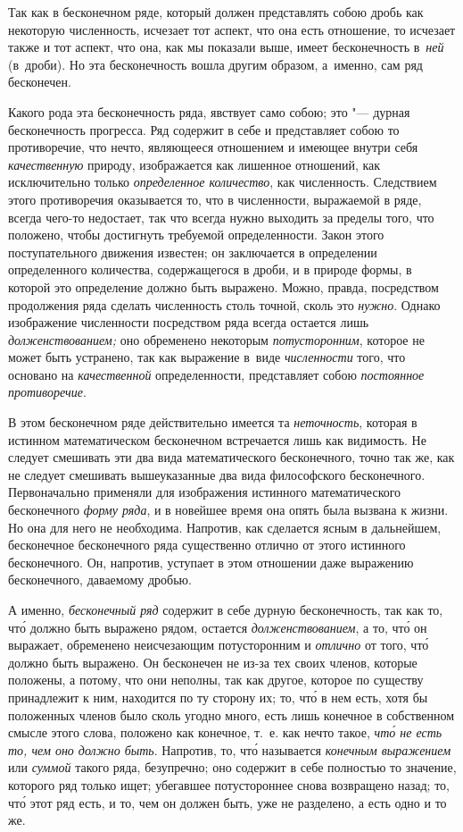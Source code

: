 Так как в бесконечном ряде, который должен представлять собою дробь как
некоторую численность, исчезает тот аспект, что она есть отношение, то исчезает
также и тот аспект, что она, как мы показали выше, имеет бесконечность
в~{\em ней} (в~дроби). Но эта бесконечность вошла другим образом, а~именно,
сам ряд бесконечен.

Какого рода эта бесконечность ряда, явствует само собою; это "--- дурная
бесконечность прогресса. Ряд содержит в себе и представляет собою то
противоречие, что нечто, являющееся отношением и имеющее внутри себя
{\em качественную} природу, изображается как лишенное отношений, как
исключительно только {\em определенное количество}, как численность. Следствием
этого противоречия оказывается то, что в численности, выражаемой в ряде, всегда
чего-то недостает, так что всегда нужно выходить за пределы того, что положено,
чтобы достигнуть требуемой определенности. Закон этого поступательного движения
известен; он заключается в определении определенного количества, содержащегося
в дроби, и в природе формы, в которой это определение должно быть выражено.
Можно, правда, посредством продолжения ряда сделать численность столь точной,
сколь это {\em нужно}. Однако изображение численности посредством ряда всегда
остается лишь {\em долженствованием;} оно обременено некоторым
{\em потусторонним}, которое не может быть устранено, так как выражение в~виде
{\em численности} того, что основано на {\em качественной} определенности,
представляет собою {\em постоянное противоречие}.

\label{bkm:bm52a}В этом бесконечном ряде действительно имеется та
{\em неточность}, которая в истинном математическом бесконечном встречается
лишь как видимость. Не следует смешивать эти два вида математического
бесконечного, точно так же, как не следует смешивать вышеуказанные два вида
философского бесконечного. Первоначально применяли для изображения истинного
математического бесконечного {\em форму ряда}, и в новейшее время она опять
была вызвана к жизни. Но она для него не необходима. Напротив, как сделается
ясным в дальнейшем, бесконечное бесконечного ряда существенно отлично от этого
истинного бесконечного. Он, напротив, уступает в этом отношении даже выражению
бесконечного, даваемому дробью.

А именно, {\em бесконечный ряд} содержит в себе дурную бесконечность, так как
то, чт\'{о} должно быть выражено рядом, остается {\em долженствованием}, а то,
чт\'{о} он выражает, обременено неисчезающим потусторонним и {\em отлично} от
того, чт\'{о} должно быть выражено. Он бесконечен не из-за тех своих членов,
которые положены, а потому, что они неполны, так как другое, которое по
существу принадлежит к ним, находится по ту сторону их; то, чт\'{о} в нем есть,
хотя бы положенных членов было сколь угодно много, есть лишь конечное в
собственном смысле этого слова, положено как конечное, т.~е. как нечто такое,
{\em чт\'{о} не есть то, чем оно должно быть}. Напротив, то, чт\'{о} называется
{\em конечным выражением} или {\em суммой} такого ряда, безупречно; оно
содержит в себе полностью то значение, которого ряд только ищет; убегавшее
потустороннее снова возвращено назад; то, чт\'{о} этот ряд есть, и то, чем он
должен быть, уже не разделено, а есть одно и то же.

